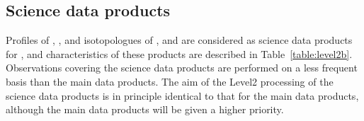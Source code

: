
\subsection{Science data products}

Profiles of , ,  and isotopologues of , and 
are considered as science data products for \smr, and
characteristics of these products are described in Table~\ref{table:level2b}.
Observations covering the science data products are performed on a less 
frequent basis than the main data products. The aim of the
Level2 processing of the science data products is in principle
identical to that for the main data products, although
the main data products will be given a higher priority.





